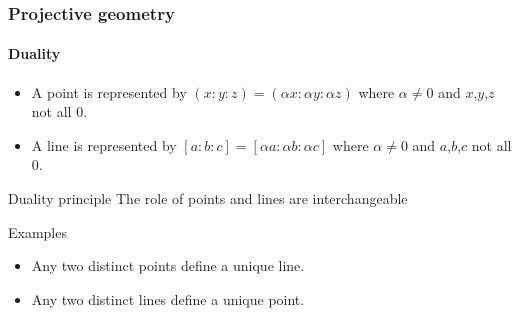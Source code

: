 \documentclass{beamer}
\begin{document}
  \begin{frame}
  	\frametitle{Projective geometry}
	\framesubtitle{Duality}
	\begin{itemize}
		\item A point is represented by $(x:y:z) = (\alpha x : \alpha y : \alpha z)$ where $\alpha \neq 0$ and $x$,$y$,$z$ not all $0$.
		\item A line is represented by $[a : b : c] = [\alpha a : \alpha b : \alpha c]$ where $\alpha \neq 0$ and $a$,$b$,$c$ not all $0$.
	\end{itemize}
	\begin{block}{Duality principle}
		The role of points and lines are interchangeable
	\end{block}
	\begin{exampleblock}{Examples}
		\begin{itemize}
			\item Any two distinct points define a unique line.
			\item Any two distinct lines define a unique point.
		\end{itemize}
	\end{exampleblock}
  \end{frame}
\end{document}
